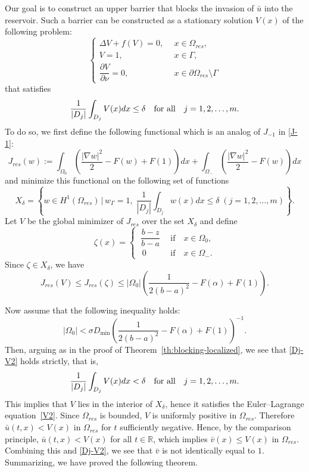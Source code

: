 \documentclass[a4paper,12pt,fullpage]{article}
\numberwithin{equation}{section}
\def\R{{\mathbb R}}
\begin{document}
Our goal is to construct an upper barrier that blocks the invasion of $\bar{u}$ into the reservoir. Such a barrier can be constructed as a stationary solution $V(x)$ of the following problem:
\begin{equation}\label{V2}
\left\{
\begin{array}{ll}
\Delta V +f(V)=0, \ \ & x\in \Omega_{res},\\[3pt]
V=1,\ \ & x\in\Gamma,\\[3pt]
\dfrac{\partial V}{\partial \nu} = 0, \ \ & x\in \partial\Omega_{res}\setminus\Gamma
\end{array}\right.
\end{equation}
that satisfies
\begin{equation}\label{Dj-V2}
\frac{1}{|D_j|} \int_{D_j} V(x) dx \leq \delta \quad \hbox{for all} \ \ \ j=1,2,\ldots,m.
\end{equation}
To do so, we first define the following functional which is an analog of $J_{-1}$ in \eqref{J-1}:
\[
J_{res}(w):=\int_{\Omega_0}\left( \frac{|\nabla w|^2}{2}-F(w)+F(1)\right)dx
+\int_{\Omega_{-}}\left( \frac{|\nabla w|^2}{2}-F(w)\right)dx
\]
and minimize this functional on the following set of functions
\[
X_\delta=\left\{ w\in H^1(\Omega_{res}) \,\Big|\, w_\Gamma=1,\; \frac{1}{|D_j|} \int_{D_j} w(x) dx \leq \delta \; (j=1,2,\ldots,m) \right\}.
\]
Let $V$ be the global minimizer of $J_{res}$ over the set $X_\delta$ and define
\[
\zeta (x) = 
\begin{cases}
\ \dfrac{b- z}{b-a} \ \  &\text{if}\quad x\in\Omega_0, \\[2pt]
\ \, 0 \quad& \text{if}\quad x\in\Omega_{-}.
\end{cases}
\]
Since $\zeta\in X_\delta$, we have
\[
J_{res}(V)\leq J_{res}(\zeta)\leq |\Omega_0|\left(\frac{1}{2(b-a)^2}-F(\alpha)+F(1)\right).
\]

Now assume that the following inequality holds:
\begin{equation}\label{ep2}
|\Omega_0|< \sigma D_{\min} \left(\frac{1}{2(b-a)^2}-F(\alpha)+F(1)\right)^{-1}.
\end{equation}
Then, arguing as in the proof of Theorem~\ref{th:blocking-localized}, we see that 
\eqref{Dj-V2} holds strictly, that is,
\[
\frac{1}{|D_j|} \int_{D_j} V(x) dx < \delta \quad \hbox{for all} \ \ \ j=1,2,\ldots,m.
\]
This implies that $V$ lies in the interior of $X_\delta$, hence it satisfies the Euler--Lagrange equation~\eqref{V2}.  Since $\Omega_{res}$ is bounded, $V$ is uniformly positive in $\Omega_{res}$. Therefore $\bar{u}(t,x)<V(x)$ in $\Omega_{res}$ for $t$ sufficiently negative. Hence, by the comparison principle, $\bar{u}(t,x)<V(x)$ for all $t\in\R$, which implies $\bar{v}(x)\leq V(x)$ in $\Omega_{res}$. Combining this and \eqref{Dj-V2}, we see that $\bar{v}$ is not identically equal to $1$. Summarizing, we have proved the following theorem.
\end{document}
